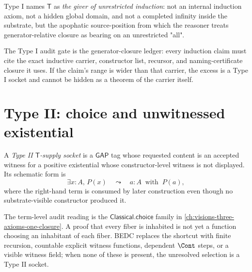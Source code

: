 \begin{definition}
\label{def:transcendental-supply-type-I-reading}
Type I names $\mathsf{T}$ as \emph{the giver of unrestricted induction}: not an internal induction axiom, not a hidden global domain, and not a completed infinity inside the substrate, but the apophatic source-position from which the reasoner treats generator-relative closure as bearing on an unrestricted "all".
\end{definition}

\begin{remark}
\label{rem:transcendental-supply-type-I-gate}
The Type I audit gate is the generator-closure ledger: every induction claim must cite the exact inductive carrier, constructor list, recursor, and naming-certificate closure it uses. If the claim's range is wider than that carrier, the excess is a Type I socket and cannot be hidden as a theorem of the carrier itself.
\end{remark}

\section{Type II: choice and unwitnessed existential}
\label{sec:transcendental-supply-type-II}

\begin{definition}
\label{def:transcendental-supply-type-II}
A \emph{Type II $\mathsf{T}$-supply socket} is a $\mathsf{GAP}$ tag whose requested content is an accepted witness for a positive existential whose constructor-level witness is not displayed. Its schematic form is
$$
\exists x:A,\,P(x)
\quad\leadsto\quad
a:A\;\;\text{with}\;\;P(a),
$$
where the right-hand term is consumed by later construction even though no substrate-visible constructor produced it.
\end{definition}

\begin{example}
\label{ex:transcendental-supply-type-II-engineering}
The term-level audit reading is the $\mathsf{Classical.choice}$ family in \autoref{ch:visions-three-axioms-one-closure}. A proof that every fiber is inhabited is not yet a function choosing an inhabitant of each fiber. BEDC replaces the shortcut with finite recursion, countable explicit witness functions, dependent $\Cont$ steps, or a visible witness field; when none of these is present, the unresolved selection is a Type II socket.
\end{example}

